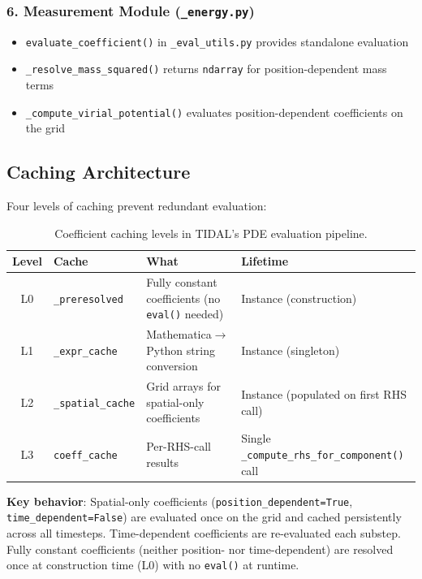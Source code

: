 \subsubsection{6. Measurement Module (\texttt{\_energy.py})}
\label{sec:bg-measurement}

\begin{itemize}
  \item \texttt{evaluate\_coefficient()} in \texttt{\_eval\_utils.py} provides standalone evaluation
  \item \texttt{\_resolve\_mass\_squared()} returns \texttt{ndarray} for position-dependent mass terms
  \item \texttt{\_compute\_virial\_potential()} evaluates position-dependent coefficients on the grid
\end{itemize}

\subsection{Caching Architecture}
\label{sec:bg-caching}

Four levels of caching prevent redundant evaluation:

\begin{table}[htbp]
\centering
\caption{Coefficient caching levels in TIDAL's PDE evaluation pipeline.}
\label{tab:bg-caching}
\begin{tabular}{@{}cllp{5cm}@{}}
\toprule
Level & Cache & What & Lifetime \\
\midrule
L0 & \texttt{\_preresolved} & Fully constant coefficients (no \texttt{eval()} needed) & Instance (construction) \\
L1 & \texttt{\_expr\_cache} & Mathematica$\to$Python string conversion & Instance (singleton) \\
L2 & \texttt{\_spatial\_cache} & Grid arrays for spatial-only coefficients & Instance (populated on first RHS call) \\
L3 & \texttt{coeff\_cache} & Per-RHS-call results & Single \texttt{\_compute\_rhs\_for\_component()} call \\
\bottomrule
\end{tabular}
\end{table}

\textbf{Key behavior}: Spatial-only coefficients (\texttt{position\_dependent=True}, \texttt{time\_dependent=False}) are evaluated once on the grid and cached persistently across all timesteps. Time-dependent coefficients are re-evaluated each substep. Fully constant coefficients (neither position- nor time-dependent) are resolved once at construction time (L0) with no \texttt{eval()} at runtime.

